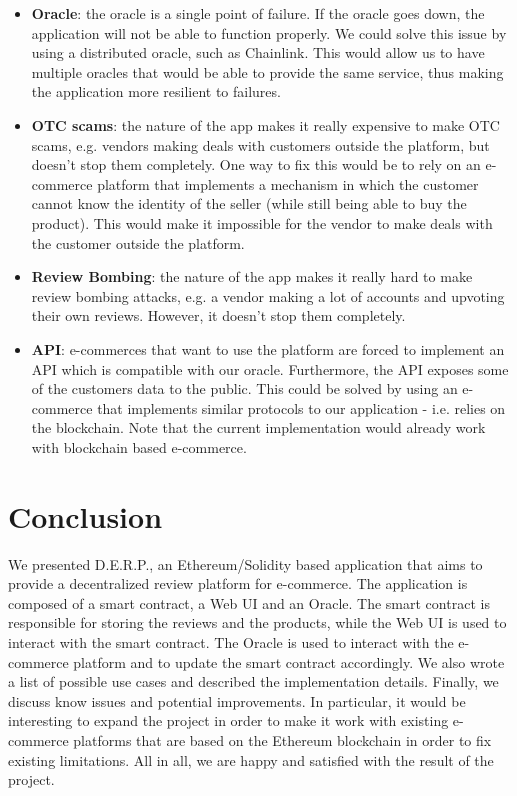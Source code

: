\documentclass[12pt,a4paper,oneside]{article}
\theoremstyle{definition}
\begin{document}
\begin{itemize}
	\item {\bf{Oracle}}: the oracle is a single point of failure. If the oracle goes down, the application will not be able to function properly. We could solve this issue by using a distributed oracle, such as Chainlink. This would allow us to have multiple oracles that would be able to provide the same service, thus making the application more resilient to failures.
	\item {\bf{OTC scams}}: the nature of the app makes it really expensive to make OTC scams, e.g. vendors making deals with customers outside the platform, but doesn't stop them completely. One way to fix this would be to rely on an e-commerce platform that implements a mechanism in which the customer cannot know the identity of the seller (while still being able to buy the product). This would make it impossible for the vendor to make deals with the customer outside the platform.
	\item {\bf{Review Bombing}}: the nature of the app makes it really hard to make review bombing attacks, e.g. a vendor making a lot of accounts and upvoting their own reviews. However, it doesn't stop them completely.
	\item {\bf{API}}: e-commerces that want to use the platform are forced to implement an API which is compatible with our oracle. Furthermore, the API exposes some of the customers data to the public. This could be solved by using an e-commerce that implements similar protocols to our application - i.e. relies on the blockchain. Note that the current implementation would already work with blockchain based e-commerce.
\end{itemize}

\section{Conclusion}

We presented D.E.R.P., an Ethereum/Solidity based application that aims to provide a decentralized review platform for e-commerce. The application is composed of a smart contract, a Web UI and an Oracle. The smart contract is responsible for storing the reviews and the products, while the Web UI is used to interact with the smart contract. The Oracle is used to interact with the e-commerce platform and to update the smart contract accordingly. We also wrote a list of possible use cases and described the implementation details. Finally, we discuss know issues and potential improvements. In particular, it would be interesting to expand the project in order to make it work with existing e-commerce platforms that are based on the Ethereum blockchain in order to fix existing limitations.
All in all, we are happy and satisfied with the result of the project. 

\newpage
\end{document}

